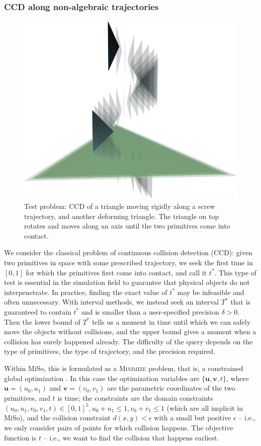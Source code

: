 \subsubsection{CCD along non-algebraic trajectories}
\begin{figure}
	\centering
	\includegraphics[width=0.8\linewidth]{fig/spiral.png}
	\caption{Test problem: CCD of a triangle moving rigidly along a screw trajectory, and another deforming triangle. The triangle on top rotates and moves along an axis until the two primitives come into contact.}
	\label{fig:ccd}
\end{figure}
We consider the classical problem of continuous collision detection (CCD): given two primitives in space with some prescribed trajectory, we seek the first time in $[0,1]$ for which the primitives first come into contact, and call it $t^*$.
This type of test is essential in the simulation field to guarantee that physical objects do not interpenetrate.
In practice, finding the exact value of $t^*$ may be infeasible and often unnecessary. With interval methods, we instead seek an interval $T^*$ that is guaranteed to contain $t^*$ and is smaller than a user-specified precision $\delta>0$.
Then the lower bound of $T^*$ tells us a moment in time until which we can safely move the objects without collisions, and the upper bound gives a moment when a collision has surely happened already.
The difficulty of the query depends on the type of primitives, the type of trajectory, and the precision required.

Within MiSo, this is formulated as a \textsc{Minimize} problem, that is, a constrained global optimization \cite{Sichetti2025}.
In this case the optimization variables are $\{\mathbf{u}, \mathbf{v}, t\}$, where $\mathbf{u}=(u_0, u_1)$ and $\mathbf{v}=(v_0, v_1)$ are the parametric coordinates of the two primitives, and $t$ is time;
the constraints are the domain constraints $(u_0,u_1,v_0,v_1,t)\in[0,1]^5, u_0+u_1\leq1, v_0+v_1\leq1$ (which are all implicit in MiSo), and the collision constraint $d(x,y)<\epsilon$ with a small but positive $\epsilon$ -- i.e., we only consider pairs of points for which collision happens.
The objective function is $t$ -- i.e., we want to find the collision that happens earliest.

